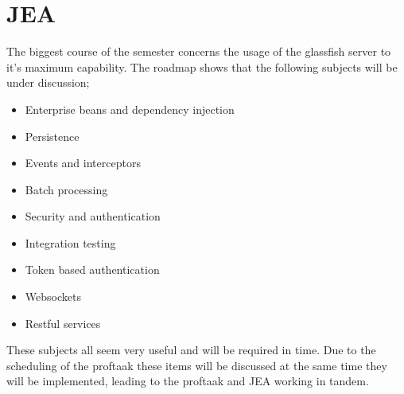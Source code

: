 \section{JEA}

The biggest course of the semester concerns the usage of the glassfish server to it's maximum capability. The roadmap shows that the following subjects will be under discussion;

\begin{itemize}
	\item Enterprise beans and dependency injection
	\item Persistence
	\item Events and interceptors
	\item Batch processing
	\item Security and authentication
	\item Integration testing
	\item Token based authentication
	\item Websockets
	\item Restful services
\end{itemize}

These subjects all seem very useful and will be required in time. Due to the scheduling of the proftaak these items will be discussed at the same time they will be implemented, leading to the proftaak and JEA working in tandem.